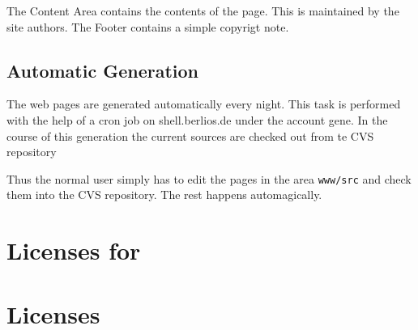 \documentclass{extex-doc}
\begin{document}
The Content Area contains the contents of the page. This is maintained
by the site authors. The Footer contains a simple copyrigt note.


\section{Automatic Generation}

The web pages are generated automatically every night. This task is
performed with the help of a cron job on shell.berlios.de under the
account gene. In the course of this generation the current sources are
checked out from te CVS repository

Thus the normal user simply has to edit the pages in the area
\texttt{www/src} and check them into the CVS repository. The rest
happens automagically.


\chapter{Licenses for \ExTeX}

\INCOMPLETE


\appendix
\chapter{Licenses}

\end{document}
